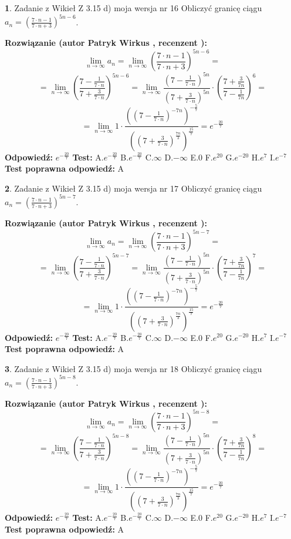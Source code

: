 \documentclass[12pt, a4paper]{article}
\theoremstyle{definition} %
\newtheorem{zad}{}
\newcommand{\zadStart}[1]{\begin{zad}#1\newline}
\newcommand{\zadStop}{\end{zad}}
\newcommand{\rozwStart}[2]{\noindent \textbf{Rozwiązanie (autor #1 , recenzent #2): }\newline}
\newcommand{\rozwStop}{\newline}
\newcommand{\odpStart}{\noindent \textbf{Odpowiedź:}\newline}
\newcommand{\odpStop}{\newline}
\newcommand{\testStart}{\noindent \textbf{Test:}\newline}
\newcommand{\testStop}{\newline}
\newcommand{\kluczStart}{\noindent \textbf{Test poprawna odpowiedź:}\newline}
\newcommand{\kluczStop}{\newline}
\begin{document}
\zadStart{Zadanie z Wikieł Z 3.15 d) moja wersja nr 16}
Obliczyć granicę ciągu $a_{n}=(\frac{7\cdot n - 1}{7 \cdot n + 3})^{5n-6}$.
\zadStop
\rozwStart{Patryk Wirkus}{}
$$\lim\limits_{n\to\infty} a_{n} = \lim\limits_{n\to\infty}(\frac{7\cdot n - 1}{7 \cdot n + 3})^{5n-6}=$$
$$=\lim\limits_{n\to\infty}(\frac{7 - \frac{1}{7\cdot n}}{7 + \frac{3}{7 \cdot n}})^{5n-6}=\lim\limits_{n\to\infty}\frac{(7 - \frac{1}{7\cdot n})^{5n}}{(7 + \frac{3}{7\cdot n})^{5n}} \cdot (\frac{7+\frac{3}{7n}}{7-\frac{1}{7n}})^{6}=$$
$$=\lim\limits_{n\to\infty} 1 \cdot \frac{((7-\frac{1}{7 \cdot n})^{-7n})^{-\frac{5}{7}}}{((7+\frac{3}{7 \cdot n})^{\frac{7n}{3}})^{\frac{15}{7}}} =e^{-\frac{20}{7}}$$
\rozwStop
\odpStart
$e^{-\frac{20}{7}}$
\odpStop
\testStart
A.$ e^{-\frac{20}{7}}$
B.$ e^{-\frac{20}{7}}$
C.$\infty$
D.$-\infty$
E.$0$
F.$e^{20}$
G.$e^{-20}$
H.$e^{7}$
I.$e^{-7}$
\testStop
\kluczStart
A
\kluczStop



\zadStart{Zadanie z Wikieł Z 3.15 d) moja wersja nr 17}
Obliczyć granicę ciągu $a_{n}=(\frac{7\cdot n - 1}{7 \cdot n + 3})^{5n-7}$.
\zadStop
\rozwStart{Patryk Wirkus}{}
$$\lim\limits_{n\to\infty} a_{n} = \lim\limits_{n\to\infty}(\frac{7\cdot n - 1}{7 \cdot n + 3})^{5n-7}=$$
$$=\lim\limits_{n\to\infty}(\frac{7 - \frac{1}{7\cdot n}}{7 + \frac{3}{7 \cdot n}})^{5n-7}=\lim\limits_{n\to\infty}\frac{(7 - \frac{1}{7\cdot n})^{5n}}{(7 + \frac{3}{7\cdot n})^{5n}} \cdot (\frac{7+\frac{3}{7n}}{7-\frac{1}{7n}})^{7}=$$
$$=\lim\limits_{n\to\infty} 1 \cdot \frac{((7-\frac{1}{7 \cdot n})^{-7n})^{-\frac{5}{7}}}{((7+\frac{3}{7 \cdot n})^{\frac{7n}{3}})^{\frac{15}{7}}} =e^{-\frac{20}{7}}$$
\rozwStop
\odpStart
$e^{-\frac{20}{7}}$
\odpStop
\testStart
A.$ e^{-\frac{20}{7}}$
B.$ e^{-\frac{20}{7}}$
C.$\infty$
D.$-\infty$
E.$0$
F.$e^{20}$
G.$e^{-20}$
H.$e^{7}$
I.$e^{-7}$
\testStop
\kluczStart
A
\kluczStop



\zadStart{Zadanie z Wikieł Z 3.15 d) moja wersja nr 18}
Obliczyć granicę ciągu $a_{n}=(\frac{7\cdot n - 1}{7 \cdot n + 3})^{5n-8}$.
\zadStop
\rozwStart{Patryk Wirkus}{}
$$\lim\limits_{n\to\infty} a_{n} = \lim\limits_{n\to\infty}(\frac{7\cdot n - 1}{7 \cdot n + 3})^{5n-8}=$$
$$=\lim\limits_{n\to\infty}(\frac{7 - \frac{1}{7\cdot n}}{7 + \frac{3}{7 \cdot n}})^{5n-8}=\lim\limits_{n\to\infty}\frac{(7 - \frac{1}{7\cdot n})^{5n}}{(7 + \frac{3}{7\cdot n})^{5n}} \cdot (\frac{7+\frac{3}{7n}}{7-\frac{1}{7n}})^{8}=$$
$$=\lim\limits_{n\to\infty} 1 \cdot \frac{((7-\frac{1}{7 \cdot n})^{-7n})^{-\frac{5}{7}}}{((7+\frac{3}{7 \cdot n})^{\frac{7n}{3}})^{\frac{15}{7}}} =e^{-\frac{20}{7}}$$
\rozwStop
\odpStart
$e^{-\frac{20}{7}}$
\odpStop
\testStart
A.$ e^{-\frac{20}{7}}$
B.$ e^{-\frac{20}{7}}$
C.$\infty$
D.$-\infty$
E.$0$
F.$e^{20}$
G.$e^{-20}$
H.$e^{7}$
I.$e^{-7}$
\testStop
\kluczStart
A
\kluczStop
\end{document}
